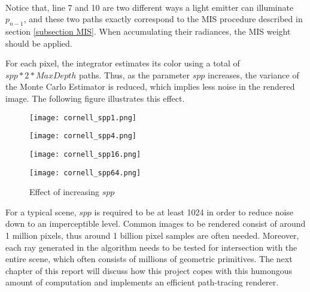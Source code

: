 ~

Notice that, line 7 and 10 are two different ways a light emitter can illuminate $p_{n-1}$, and these two paths exactly correspond to the MIS procedure described in section \ref{subsection MIS}. When accumulating their radiances, the MIS weight should be applied.


For each pixel, the integrator estimates its color using a total of $spp*2*MaxDepth$ paths. Thus, as the parameter $spp$ increases, the variance of the Monte Carlo Estimator is reduced, which implies less noise in the rendered image. The following figure illustrates this effect.


\begin{figure}[H]
    \centering
    
    \begin{minipage}[t]{.45\textwidth}
        \centering
        \vspace{0pt}
        \texttt{[image: cornell\_spp1.png]}
    \end{minipage}
    \begin{minipage}[t]{.45\textwidth}
        \centering
        \vspace{0pt}
        \texttt{[image: cornell\_spp4.png]}
    \end{minipage}

    \vspace{0.3cm}

    \begin{minipage}[t]{.45\textwidth}
        \centering
        \vspace{0pt}
        \texttt{[image: cornell\_spp16.png]}
    \end{minipage}
    \begin{minipage}[t]{.45\textwidth}
        \centering
        \vspace{0pt}
        \texttt{[image: cornell\_spp64.png]}
    \end{minipage}
    \caption{Effect of increasing $spp$}
    \label{fig spp}
\end{figure}

For a typical scene, $spp$ is required to be at least 1024 in order to reduce noise down to an imperceptible level. Common images to be rendered consist of around 1 million pixels, thus around 1 billion pixel samples are often needed. Moreover, each ray generated in the algorithm needs to be tested for intersection with the entire scene, which often consists of millions of geometric primitives. The next chapter of this report will discuss how this project copes with this humongous amount of computation and implements an efficient path-tracing renderer.

